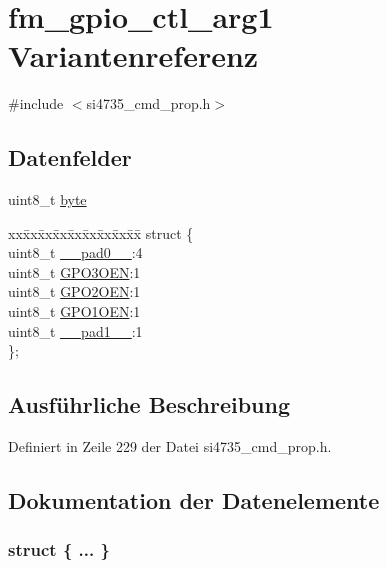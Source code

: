 \hypertarget{unionfm__gpio__ctl__arg1}{}\section{fm\+\_\+gpio\+\_\+ctl\+\_\+arg1 Variantenreferenz}
\label{unionfm__gpio__ctl__arg1}


{\ttfamily \#include $<$si4735\+\_\+cmd\+\_\+prop.\+h$>$}

\subsection*{Datenfelder}
\begin{DoxyCompactItemize}
\item 
uint8\+\_\+t \hyperlink{unionfm__gpio__ctl__arg1_a96f44d20f1dbf1c8785a7bc99a46164c}{byte}
\item 
\begin{tabbing}
xx\=xx\=xx\=xx\=xx\=xx\=xx\=xx\=xx\=\kill
struct \{\\
\>uint8\_t \hyperlink{unionfm__gpio__ctl__arg1_a8b4eebe79ded0459acec2f4950102ba3}{\_\_pad0\_\_}:4\\
\>uint8\_t \hyperlink{unionfm__gpio__ctl__arg1_a64a711e579f7c8b59e983c9bd6f9dfca}{GPO3OEN}:1\\
\>uint8\_t \hyperlink{unionfm__gpio__ctl__arg1_aa16577946f684dfeeee75c5552b2cf32}{GPO2OEN}:1\\
\>uint8\_t \hyperlink{unionfm__gpio__ctl__arg1_a42407c116374825855d895ede3d3fef2}{GPO1OEN}:1\\
\>uint8\_t \hyperlink{unionfm__gpio__ctl__arg1_a77f12d2e278bd5c07712648ac0df5e08}{\_\_pad1\_\_}:1\\
\}; \\

\end{tabbing}\end{DoxyCompactItemize}


\subsection{Ausführliche Beschreibung}


Definiert in Zeile 229 der Datei si4735\+\_\+cmd\+\_\+prop.\+h.



\subsection{Dokumentation der Datenelemente}
\hypertarget{unionfm__gpio__ctl__arg1_a174d45fe82658eb97db52193a87b03c5}{}\subsubsection[{"@37}]{\setlength{\rightskip}{0pt plus 5cm}struct \{ ... \} }\label{unionfm__gpio__ctl__arg1_a174d45fe82658eb97db52193a87b03c5}
\hypertarget{unionfm__gpio__ctl__arg1_a8b4eebe79ded0459acec2f4950102ba3}{}
